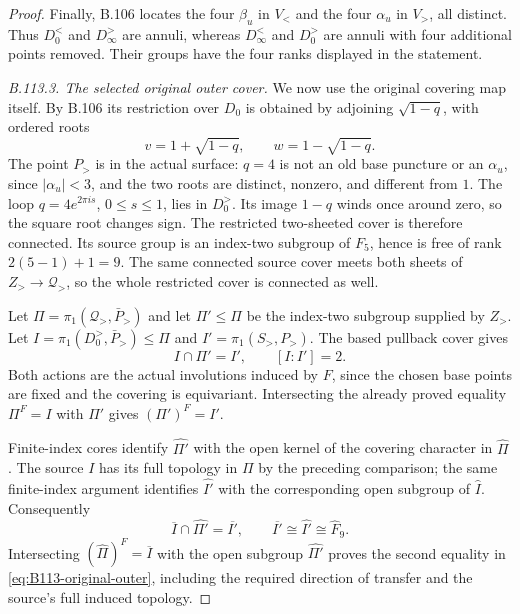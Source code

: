 \begin{proof}
Finally, B.106 locates the four $\beta_u$ in $V_<$ and the four
$\alpha_u$ in $V_>$, all distinct. Thus $D_0^<$ and
$D_\infty^>$ are annuli, whereas $D_\infty^<$ and $D_0^>$
are annuli with four additional points removed. Their groups have
the four ranks displayed in the statement.

\emph{B.113.3. The selected original outer cover.}
We now use the original covering map itself. By B.106 its
restriction over $D_0$ is obtained by adjoining $\sqrt{1-q}$,
with ordered roots
\[
 v=1+\sqrt{1-q},\qquad w=1-\sqrt{1-q}.
\]
The point $P_>$ is in the actual surface: $q=4$ is not an old
base puncture or an $\alpha_u$, since $|\alpha_u|<3$, and the
two roots are distinct, nonzero, and different from $1$.
The loop $q=4e^{2\pi i s}$, $0\le s\le1$, lies in $D_0^>$.
Its image $1-q$ winds once around zero, so the square root
changes sign. The restricted two-sheeted cover is therefore
connected. Its source group is an index-two subgroup of $F_5$,
hence is free of rank $2(5-1)+1=9$. The same connected source
cover meets both sheets of $Z_>\to\mathscr Q_>$, so the whole
restricted cover is connected as well.

Let $\Pi=\pi_1(\mathscr Q_>,\bar P_>)$ and let
$\Pi'\le\Pi$ be the index-two subgroup supplied by $Z_>$.
Let $I=\pi_1(D_0^>,\bar P_>)\le\Pi$ and
$I'=\pi_1(S_>,P_>)$. The based pullback cover gives
\[
 I\cap\Pi'=I',\qquad [I:I']=2.
\]
Both actions are the actual involutions induced by $F$, since
the chosen base points are fixed and the covering is equivariant.
Intersecting the already proved equality $\Pi^F=I$ with
$\Pi'$ gives $(\Pi')^F=I'$.

Finite-index cores identify $\widehat{\Pi'}$ with the open
kernel of the covering character in $\widehat\Pi$. The source
$I$ has its full topology in $\Pi$ by the preceding comparison;
the same finite-index argument identifies $\widehat{I'}$ with
the corresponding open subgroup of $\widehat I$. Consequently
\[
 \overline I\cap\widehat{\Pi'}=\overline{I'},
 \qquad
 \overline{I'}\cong\widehat{I'}\cong\widehat F_9.
\]
Intersecting $(\widehat\Pi)^F=\overline I$ with the open
subgroup $\widehat{\Pi'}$ proves the second equality in
\eqref{eq:B113-original-outer}, including the required direction
of transfer and the source's full induced topology.
\end{proof}
